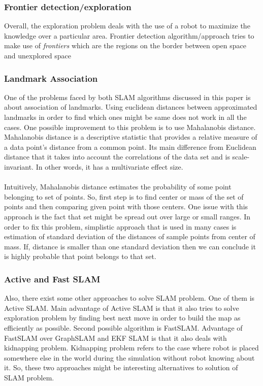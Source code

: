 \documentclass{ba-kecs}
\numberwithin{figure}{section}
\numberwithin{equation}{section}
\begin{document}
\subsubsection{Frontier detection/exploration}
	Overall, the exploration problem deals with the use of a robot to maximize the knowledge over a particular area. Frontier detection algorithm/approach tries to make use of \textit{frontiers} which are the regions on the border between open space and unexplored space \cite{frontier}
	
\subsubsection{Landmark Association}
One of the problems faced by both SLAM algorithms discussed in this paper is about association of landmarks. Using euclidean distances between approximated landmarks in order to find which ones might be same does not work in all the cases. One possible improvement to this problem is to use Mahalanobis distance. Mahalanobis distance is a descriptive statistic that provides a relative measure of a data point's distance from a common point. Its main difference from Euclidean distance that it takes into account the correlations of the data set and is scale-invariant. In other words, it has a multivariate effect size.\\ \\
Intuitively, Mahalanobis distance estimates the probability of some point belonging to set of points. So, first step is to find center or mass of the set of points and then comparing given point with those centers. One issue with this approach is the fact that set might be spread out over large or small ranges. In order to fix this problem, simplistic approach that is used in many cases is estimation of standard deviation of the distances of sample points from center of mass. If, distance is smaller than one standard deviation then we can conclude it is highly probable that point belongs to that set.
\subsubsection{Active and Fast SLAM}
Also, there exist some other approaches to solve SLAM problem. One of them is Active SLAM. Main advantage of Active SLAM is that it also tries to solve exploration problem by finding best next move in order to build the map as efficiently as possible. Second possible algorithm is FastSLAM. Advantage of FastSLAM over GraphSLAM and EKF SLAM is that it also deals with kidnapping problem. Kidnapping problem refers to the case where robot is placed somewhere else in the world during the simulation without robot knowing about it. So, these two approaches might be interesting alternatives to solution of SLAM problem.
\end{document}
